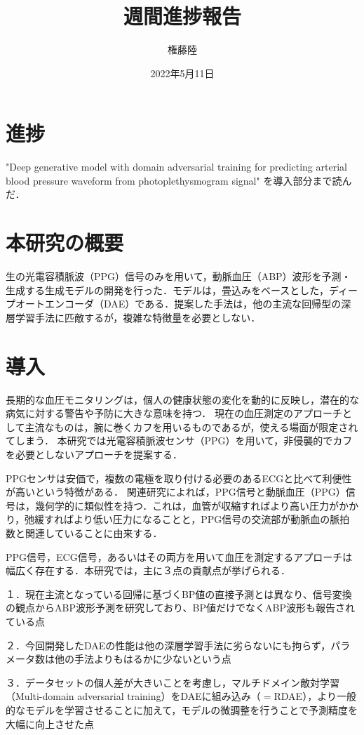 \documentclass[dvipdfmx]{jsarticle}
\begin{document}
\title{週間進捗報告}
\author{権藤陸}
\date{2022年5月11日}
\maketitle
\section{進捗}
"Deep generative model with domain adversarial training for predicting arterial blood pressure waveform from photoplethysmogram signal" を導入部分まで読んだ．
\section{本研究の概要}
生の光電容積脈波（PPG）信号のみを用いて，動脈血圧（ABP）波形を予測・生成する生成モデルの開発を行った．モデルは，畳込みをベースとした，ディープオートエンコーダ（DAE）である．提案した手法は，他の主流な回帰型の深層学習手法に匹敵するが，複雑な特徴量を必要としない．
\section{導入}
長期的な血圧モニタリングは，個人の健康状態の変化を動的に反映し，潜在的な病気に対する警告や予防に大きな意味を持つ．
現在の血圧測定のアプローチとして主流なものは，腕に巻くカフを用いるものであるが，使える場面が限定されてしまう．
本研究では光電容積脈波センサ（PPG）を用いて，非侵襲的でカフを必要としないアプローチを提案する．

PPGセンサは安価で，複数の電極を取り付ける必要のあるECGと比べて利便性が高いという特徴がある．
関連研究によれば，PPG信号と動脈血圧（PPG）信号は，幾何学的に類似性を持つ\cite{one}．これは，血管が収縮すればより高い圧力がかかり，弛緩すればより低い圧力になることと，PPG信号の交流部が動脈血の脈拍数と関連していることに由来する．

PPG信号，ECG信号，あるいはその両方を用いて血圧を測定するアプローチは幅広く存在する．本研究では，主に３点の貢献点が挙げられる．

１．現在主流となっている回帰に基づくBP値の直接予測とは異なり、信号変換の観点からABP波形予測を研究しており、BP値だけでなくABP波形も報告されている点

２．今回開発したDAEの性能は他の深層学習手法に劣らないにも拘らず，パラメータ数は他の手法よりもはるかに少ないという点

３．データセットの個人差が大きいことを考慮し，マルチドメイン敵対学習（Multi-domain adversarial training）をDAEに組み込み（$=$RDAE），より一般的なモデルを学習させることに加えて，モデルの微調整を行うことで予測精度を大幅に向上させた点
\end{document}
